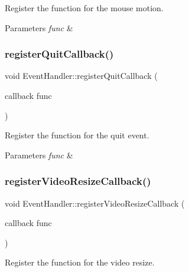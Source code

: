 Register the function for the mouse motion. 


\begin{DoxyParams}{Parameters}
{\em func} & \\
\hline
\end{DoxyParams}
\mbox{\label{classEventHandler_abad5fb59e15a41ce6fcb1fed634d0f37}} 
\subsubsection{\texorpdfstring{registerQuitCallback()}{registerQuitCallback()}}
{\footnotesize\ttfamily void Event\+Handler\+::register\+Quit\+Callback (\begin{DoxyParamCaption}\item[{callback}]{func }\end{DoxyParamCaption})}



Register the function for the quit event. 


\begin{DoxyParams}{Parameters}
{\em func} & \\
\hline
\end{DoxyParams}
\mbox{\label{classEventHandler_ad456a9c086ff1fe010a428026eddba9c}} 
\subsubsection{\texorpdfstring{registerVideoResizeCallback()}{registerVideoResizeCallback()}}
{\footnotesize\ttfamily void Event\+Handler\+::register\+Video\+Resize\+Callback (\begin{DoxyParamCaption}\item[{callback}]{func }\end{DoxyParamCaption})}



Register the function for the video resize. 

\mbox{\label{classEventHandler_a0fb543b17c41ef73df71b9498fd45359}} 
